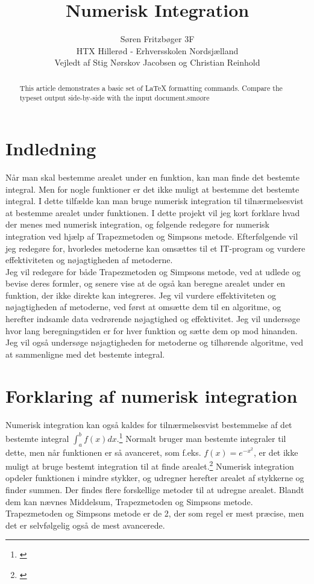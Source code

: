 \documentclass[12pt]{article}
\numberwithin{equation}{section}
\begin{document}
\title{Numerisk Integration}
\author{Søren Fritzbøger 3F\\
HTX Hillerød - Erhversskolen Nordsjælland\\
Vejledt af Stig Nørskov Jacobsen og Christian Reinhold}
\renewcommand{\today}{2. Februar 2015}
\maketitle

\begin{abstract}
This article demonstrates a basic set of LaTeX formatting commands.
Compare the typeset output side-by-side with the input document.smøøre
\end{abstract}
\newpage
\tableofcontents
\newpage
\section{Indledning}
Når man skal bestemme arealet under en funktion, kan man finde det bestemte integral. Men for nogle funktioner er det ikke muligt at bestemme det bestemte integral. I dette tilfælde kan man bruge numerisk integration til tilnærmelsesvist at bestemme arealet under funktionen. I dette projekt vil jeg kort forklare hvad der menes med numerisk integration, og følgende redegøre for numerisk integration ved hjælp af Trapezmetoden og Simpsons metode. Efterfølgende vil jeg redegøre for, hvorledes metoderne kan omsættes til et IT-program og vurdere effektiviteten og nøjagtigheden af metoderne.
\\
Jeg vil redegøre for både Trapezmetoden og Simpsons metode, ved at udlede og bevise deres formler, og senere vise at de også kan beregne arealet under en funktion, der ikke direkte kan integreres. Jeg vil vurdere effektiviteten og nøjagtigheden af metoderne, ved først at omsætte dem til en algoritme, og herefter indsamle data vedrørende nøjagtighed og effektivitet. Jeg vil undersøge hvor lang beregningstiden er for hver funktion og sætte dem op mod hinanden. Jeg vil også undersøge nøjagtigheden for metoderne og tilhørende algoritme, ved at sammenligne med det bestemte integral.

\section{Forklaring af numerisk integration}
Numerisk integration kan også kaldes for tilnærmelsesvist bestemmelse af det bestemte integral $\int_{a}^{b}f(x)dx$.\footnote{\cite{numeriskintegration}} Normalt bruger man bestemte integraler til dette, men når funktionen er så avanceret, som f.eks. $f(x)=e^{-x^2}$, er det ikke muligt at bruge bestemt integration til at finde arealet.\footnote{\cite{2012matA}} Numerisk integration opdeler funktionen i mindre stykker, og udregner herefter arealet af stykkerne og finder summen. Der findes flere forskellige metoder til at udregne arealet. Blandt dem kan nævnes Middelsum, Trapezmetoden og Simpsons metode. Trapezmetoden og Simpsons metode er de 2, der som regel er mest præcise, men det er selvfølgelig også de mest avancerede.
\end{document}
